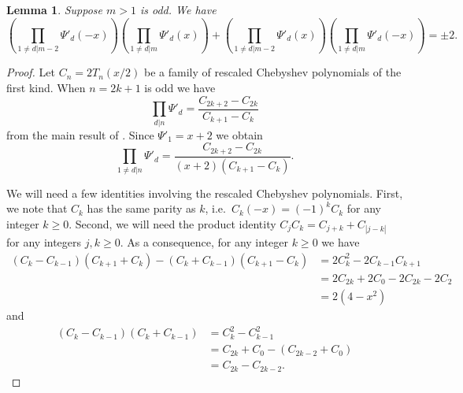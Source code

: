 \documentclass{amsart}
\theoremstyle{plain}
\newtheorem{lem}[thm]{Lemma}
\theoremstyle{definition}
\theoremstyle{remark}
\numberwithin{equation}{section}
\begin{document}
\begin{lem} \label{lem:psiprimebezout}
Suppose $m>1$ is odd. 
We have
\begin{equation}
\left(\prod_{1 \neq d|m-2} \Psi'_d(-x)\right)\left(\prod_{1 \neq d|m}\Psi'_d(x)\right)+\left(\prod_{1 \neq d|m-2} \Psi'_d(x)\right)\left(\prod_{1 \neq d|m}\Psi'_d(-x)\right) = \pm 2 \text{.} \label{eq:psiprimebezout}
\end{equation}
\end{lem}

\begin{proof}
Let $C_n=2T_n(x/2)$ be a family of rescaled Chebyshev polynomials of the first kind. 
When $n=2k+1$ is odd we have
\begin{equation*}
\prod_{d|n} \Psi'_d = \frac{C_{2k+2}-C_{2k}}{C_{k+1}-C_k}
\end{equation*}
from the main result of \cite{wz-minpolcos}. 
Since $\Psi'_1=x+2$ we obtain
\begin{equation}
\prod_{1 \neq d|n} \Psi'_d = \frac{C_{2k+2}-C_{2k}}{(x+2)(C_{k+1}-C_k)} \text{.} \label{eq:psiprimeprod}
\end{equation}

We will need a few identities involving the rescaled Chebyshev polynomials. 
First, we note that $C_k$ has the same parity as $k$, i.e.~$C_k(-x)=(-1)^k C_k$ for any integer $k \geq 0$.
Second, we will need the product identity $C_j C_k = C_{j+k} + C_{|j-k|}$ for any integers $j,k \geq 0$. 
As a consequence, for any integer $k \geq 0$ we have
\begin{align}
(C_{k}-C_{k-1})(C_{k+1}+C_k) - (C_{k}+C_{k-1})(C_{k+1}-C_k) & =2C_k^2 - 2C_{k-1}C_{k+1} \nonumber \\
& =2C_{2k}+2C_0-2C_{2k}-2C_2  \label{eq:chebprod1} \\
& =2(4-x^2) \nonumber
\end{align}
and
\begin{align}
(C_k-C_{k-1})(C_k+C_{k-1}) & =C_k^2 - C_{k-1}^2 \nonumber \\
& =C_{2k}+C_0-(C_{2k-2}+C_0) \label{eq:chebprod2}\\
& =C_{2k}-C_{2k-2} \text{.} \nonumber
\end{align}


\end{proof}
\end{document}
